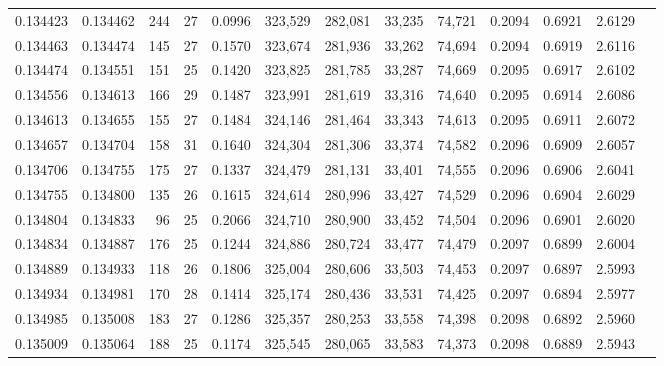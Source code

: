 \begin{tabular}{rrrrrrrrrrrrr}
0.134423 & 0.134462 & 244 &  27 &                                     0.0996 & 323,529 & 282,081 &  33,235 &  74,721 & 0.2094 & 0.6921 & 2.6129 \\
0.134463 & 0.134474 & 145 &  27 &                                     0.1570 & 323,674 & 281,936 &  33,262 &  74,694 & 0.2094 & 0.6919 & 2.6116 \\
0.134474 & 0.134551 & 151 &  25 &                                     0.1420 & 323,825 & 281,785 &  33,287 &  74,669 & 0.2095 & 0.6917 & 2.6102 \\
0.134556 & 0.134613 & 166 &  29 &                                     0.1487 & 323,991 & 281,619 &  33,316 &  74,640 & 0.2095 & 0.6914 & 2.6086 \\
0.134613 & 0.134655 & 155 &  27 &                                     0.1484 & 324,146 & 281,464 &  33,343 &  74,613 & 0.2095 & 0.6911 & 2.6072 \\
0.134657 & 0.134704 & 158 &  31 &                                     0.1640 & 324,304 & 281,306 &  33,374 &  74,582 & 0.2096 & 0.6909 & 2.6057 \\
0.134706 & 0.134755 & 175 &  27 &                                     0.1337 & 324,479 & 281,131 &  33,401 &  74,555 & 0.2096 & 0.6906 & 2.6041 \\
0.134755 & 0.134800 & 135 &  26 &                                     0.1615 & 324,614 & 280,996 &  33,427 &  74,529 & 0.2096 & 0.6904 & 2.6029 \\
0.134804 & 0.134833 &  96 &  25 &                                     0.2066 & 324,710 & 280,900 &  33,452 &  74,504 & 0.2096 & 0.6901 & 2.6020 \\
0.134834 & 0.134887 & 176 &  25 &                                     0.1244 & 324,886 & 280,724 &  33,477 &  74,479 & 0.2097 & 0.6899 & 2.6004 \\
0.134889 & 0.134933 & 118 &  26 &                                     0.1806 & 325,004 & 280,606 &  33,503 &  74,453 & 0.2097 & 0.6897 & 2.5993 \\
0.134934 & 0.134981 & 170 &  28 &                                     0.1414 & 325,174 & 280,436 &  33,531 &  74,425 & 0.2097 & 0.6894 & 2.5977 \\
0.134985 & 0.135008 & 183 &  27 &                                     0.1286 & 325,357 & 280,253 &  33,558 &  74,398 & 0.2098 & 0.6892 & 2.5960 \\
0.135009 & 0.135064 & 188 &  25 &                                     0.1174 & 325,545 & 280,065 &  33,583 &  74,373 & 0.2098 & 0.6889 & 2.5943 \\

\end{tabular}
